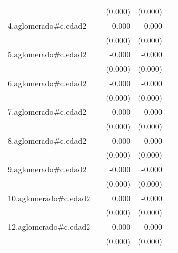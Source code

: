 {\begin{longtable}{l*{4}{D{.}{.}{-1}}}
            &                     &     (0.000)         &     (0.000)         &                     \\
\addlinespace
4.aglomerado#c.edad2&                     &      -0.000         &      -0.000\sym{***}&                     \\
            &                     &     (0.000)         &     (0.000)         &                     \\
\addlinespace
5.aglomerado#c.edad2&                     &      -0.000         &      -0.000         &                     \\
            &                     &     (0.000)         &     (0.000)         &                     \\
\addlinespace
6.aglomerado#c.edad2&                     &      -0.000         &      -0.000\sym{*}  &                     \\
            &                     &     (0.000)         &     (0.000)         &                     \\
\addlinespace
7.aglomerado#c.edad2&                     &      -0.000         &      -0.000         &                     \\
            &                     &     (0.000)         &     (0.000)         &                     \\
\addlinespace
8.aglomerado#c.edad2&                     &       0.000         &       0.000         &                     \\
            &                     &     (0.000)         &     (0.000)         &                     \\
\addlinespace
9.aglomerado#c.edad2&                     &      -0.000         &      -0.000\sym{***}&                     \\
            &                     &     (0.000)         &     (0.000)         &                     \\
\addlinespace
10.aglomerado#c.edad2&                     &       0.000         &      -0.000         &                     \\
            &                     &     (0.000)         &     (0.000)         &                     \\
\addlinespace
12.aglomerado#c.edad2&                     &       0.000\sym{*}  &       0.000         &                     \\
            &                     &     (0.000)         &     (0.000)         &                     \\

\end{longtable}}
